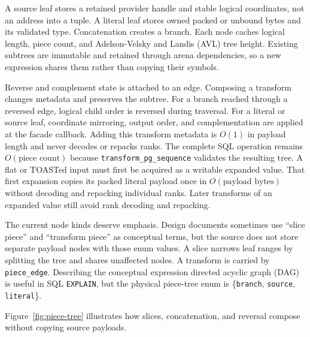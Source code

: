 A source leaf stores a retained provider handle and stable logical
coordinates, not an address into a tuple.  A literal leaf stores owned packed
or unbound bytes and its validated type.  Concatenation creates a branch.
Each node caches logical length, piece count, and Adelson-Velsky and Landis
(AVL) tree height.  Existing
subtrees are immutable and retained through arena dependencies, so a new
expression shares them rather than copying their symbols.

Reverse and complement state is attached to an edge.  Composing a transform
changes metadata and preserves the subtree.  For a branch reached through a
reversed edge, logical child order is reversed during traversal.  For a
literal or source leaf, coordinate mirroring, output order, and complementation
are applied at the facade callback.  Adding this transform metadata is
\(O(1)\) in payload length and never decodes or repacks ranks.  The complete SQL
operation remains \(O(\text{piece count})\) because
\texttt{transform\_pg\_sequence} validates the resulting tree.  A flat or
TOASTed input must first be acquired as a writable expanded value.  That first
expansion copies its packed literal payload once in \(O(\text{payload bytes})\)
without decoding and repacking individual ranks.  Later transforms of an
expanded value still avoid rank decoding and repacking.

The current node kinds deserve emphasis.  Design documents sometimes use
``slice piece'' and ``transform piece'' as conceptual terms, but the source
does not store separate payload nodes with those enum values.  A slice narrows
leaf ranges by splitting the tree and shares unaffected nodes.  A transform is
carried by \texttt{piece\_edge}.  Describing the conceptual expression directed
acyclic graph (DAG) is useful in SQL \texttt{EXPLAIN}, but the physical
piece-tree enum is
\{\texttt{branch}, \texttt{source}, \texttt{literal}\}.

Figure~\ref{fig:piece-tree} illustrates how slices, concatenation, and reversal
compose without copying source payloads.

